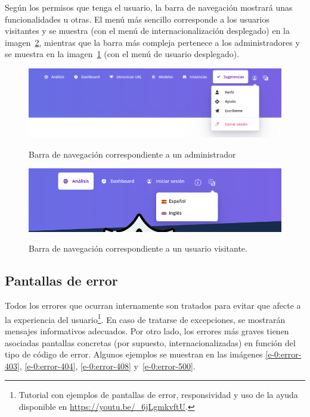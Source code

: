 Según los permisos que tenga el usuario, la barra de navegación mostrará unas funcionalidades u otras. El menú más sencillo corresponde a los usuarios visitantes y se muestra (con el menú de internacionalización desplegado) en la imagen~\ref{e-9:navbar-2}, mientras que la barra más compleja pertenece a los administradores y se muestra en la imagen~\ref{e-9:navbar} (con el menú de usuario desplegado).
\begin{figure}[h]
	\caption[Manual de usuario: barra navegación (usuario iniciado)]{Barra de navegación correspondiente a un administrador}
	\centering
	\includegraphics[width=\textwidth]{../img/anexos/user_guide/9_navbar_init}
	\label{e-9:navbar}
\end{figure}

\begin{figure}[h]
	\caption[Manual de usuario: barra navegación (visitante)]{Barra de navegación correspondiente a un usuario visitante.}
	\centering
	\includegraphics[width=\textwidth]{../img/anexos/user_guide/9_navbar_no_init}
	\label{e-9:navbar-2}
\end{figure}

\subsection{Pantallas de error}

Todos los errores que ocurran internamente son tratados para evitar que afecte a la experiencia del usuario\footnote{Tutorial con ejemplos de pantallas de error, responsividad y uso de la ayuda disponible en \url{https://youtu.be/_6jLgmkvftU}.}. En caso de tratarse de excepciones, se mostrarán mensajes informativos adecuados. Por otro lado, los errores más graves tienen asociadas pantallas concretas (por supuesto, internacionalizadas) en función del tipo de código de error. Algunos ejemplos se muestran en las imágenes \ref{e-0:error-403}, \ref{e-0:error-404}, \ref{e-0:error-408} y~\ref{e-0:error-500}.

